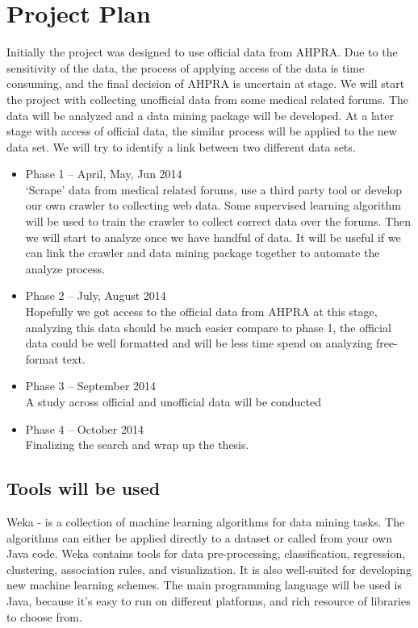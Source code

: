 \documentclass[a4paper,11pt]{article}
\begin{document}
\section{Project Plan}
Initially the project was designed to use official data from AHPRA.\cite{ref8} Due to the sensitivity of the data, the process of applying access of the data is time consuming, and the final decision of AHPRA is uncertain at stage. We will start the project with collecting unofficial data from some medical related forums. The data will be analyzed and a data mining package will be developed. At a later stage with access of official data, the similar process will be applied to the new data set. We will try to identify a link between two different data sets.
\begin{itemize}
\item Phase 1 – April, May, Jun 2014\\
‘Scrape’ data from medical related forums, use a third party tool or develop our own crawler to collecting web data. Some supervised learning algorithm will be used to train the crawler to collect correct data over the forums. Then we will start to analyze once we have handful of data. 
It will be useful if we can link the crawler and data mining package together to automate the analyze process.
\item Phase 2 – July, August 2014\\
Hopefully we got access to the official data from AHPRA at this stage, analyzing this data should be much easier compare to phase 1, the official data could be well formatted and will be less time spend on analyzing free-format text.
\item Phase 3 – September 2014\\
A study across official and unofficial data will be conducted
\item Phase 4 – October 2014\\
Finalizing the search and wrap up the thesis.
\end{itemize}

\subsection{Tools will be used}
Weka\cite{ref7} - is a collection of machine learning algorithms for data mining tasks. The algorithms can either be applied directly to a dataset or called from your own Java code. Weka contains tools for data pre-processing, classification, regression, clustering, association rules, and visualization. It is also well-suited for developing new machine learning schemes.
The main programming language will be used is Java, because it’s easy to run on different platforms, and rich resource of libraries to choose from. 
\end{document}
